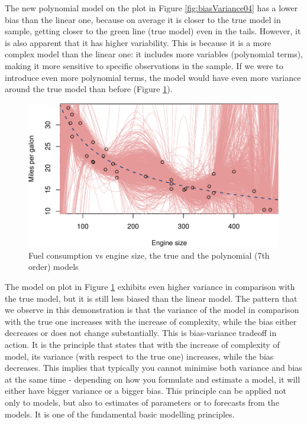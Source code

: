 \documentclass[
]{book}
\theoremstyle{definition}
\theoremstyle{definition}
\theoremstyle{definition}
\theoremstyle{definition}
\theoremstyle{remark}
\begin{document}
The new polynomial model on the plot in Figure \ref{fig:biasVariance04} has a lower bias than the linear one, because on average it is closer to the true model in sample, getting closer to the green line (true model) even in the tails. However, it is also apparent that it has higher variability. This is because it is a more complex model than the linear one: it includes more variables (polynomial terms), making it more sensitive to specific observations in the sample. If we were to introduce even more polynomial terms, the model would have even more variance around the true model than before (Figure \ref{fig:biasVariance05}).

\begin{figure}
\centering
\includegraphics{Svetunkov---Statistics-for-Business-Analytics_files/figure-latex/biasVariance05-1.pdf}
\caption{\label{fig:biasVariance05}Fuel consumption vs engine size, the true and the polynomial (7th order) models}
\end{figure}

The model on plot in Figure \ref{fig:biasVariance05} exhibits even higher variance in comparison with the true model, but it is still less biased than the linear model. The pattern that we observe in this demonstration is that the variance of the model in comparison with the true one increases with the increase of complexity, while the bias either decreases or does not change substantially. This is bias-variance tradeoff in action. It is the principle that states that with the increase of complexity of model, its variance (with respect to the true one) increases, while the bias decreases. This implies that typically you cannot minimise both variance and bias at the same time - depending on how you formulate and estimate a model, it will either have bigger variance or a bigger bias. This principle can be applied not only to models, but also to estimates of parameters or to forecasts from the models. It is one of the fundamental basic modelling principles.
\end{document}
